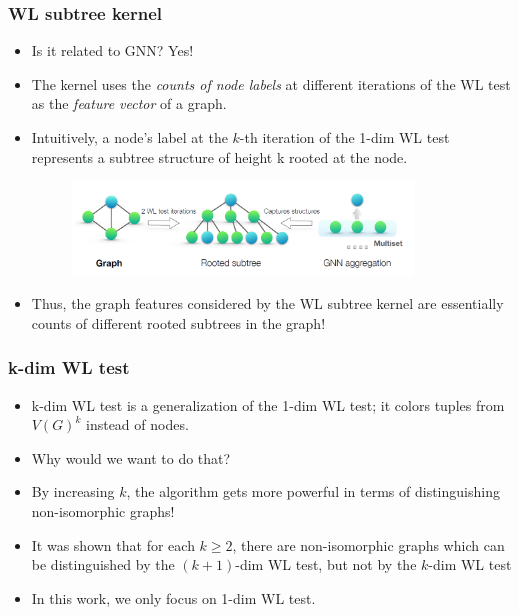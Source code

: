 \documentclass[handout]{beamer}
\begin{document}
\begin{frame}
\frametitle{WL subtree kernel}

\begin{itemize}
	\item Is it related to GNN? \pause Yes! \pause
	
	\item The kernel uses the {\it counts of node labels} at different iterations of the WL test as the {\it feature vector} of a graph. \pause
	
	\item Intuitively, a node’s label at the $k$-th iteration of the 1-dim WL test represents a subtree structure of height k rooted at the node.

	\begin{figure}[hbt]
		\includegraphics[height=2.5cm]{fig2.png}
	\end{figure}

	\item Thus, the graph features considered by the WL subtree kernel are essentially counts of different rooted subtrees in the graph!

\end{itemize}

\end{frame}

\begin{frame}
\frametitle{k-dim WL test}

\begin{itemize}
	\item k-dim WL test is a generalization of the 1-dim WL test; it colors tuples from $V(G)^k$ instead of nodes. \pause
	
	\item Why would we want to do that? \pause
	
	\item  By increasing $k$, the algorithm gets more powerful in terms of distinguishing non-isomorphic graphs!   \pause

	\item It was shown that for each $k \geq 2$, there are non-isomorphic graphs which can be distinguished by the $(k + 1)$-dim WL test, but not by the $k$-dim WL test \pause
	
	\item In this work, we only focus on 1-dim WL test.
\end{itemize}

\end{frame}
\end{document}
